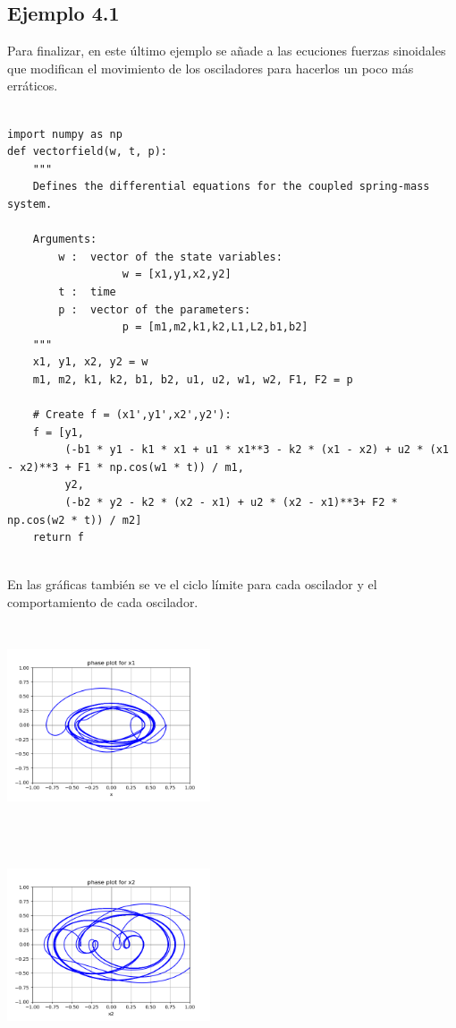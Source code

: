 \documentclass{article}
\begin{document}
\subsection{Ejemplo 4.1}

Para finalizar, en este último ejemplo se añade a las ecuciones fuerzas sinoidales que modifican el movimiento de los osciladores para hacerlos un poco más erráticos.

\begin{verbatim}

import numpy as np
def vectorfield(w, t, p):
    """
    Defines the differential equations for the coupled spring-mass system.

    Arguments:
        w :  vector of the state variables:
                  w = [x1,y1,x2,y2]
        t :  time
        p :  vector of the parameters:
                  p = [m1,m2,k1,k2,L1,L2,b1,b2]
    """
    x1, y1, x2, y2 = w
    m1, m2, k1, k2, b1, b2, u1, u2, w1, w2, F1, F2 = p

    # Create f = (x1',y1',x2',y2'):
    f = [y1,
         (-b1 * y1 - k1 * x1 + u1 * x1**3 - k2 * (x1 - x2) + u2 * (x1 - x2)**3 + F1 * np.cos(w1 * t)) / m1,
         y2,
         (-b2 * y2 - k2 * (x2 - x1) + u2 * (x2 - x1)**3+ F2 * np.cos(w2 * t)) / m2]
    return f
    
\end{verbatim}


En las gráficas también se ve el ciclo límite para cada oscilador y el comportamiento de cada oscilador.
\begin{center}
  \includegraphics[width=6cm, height=6cm]{ej4_11.png}
\end{center}


\begin{center}
  \includegraphics[width=6cm, height=6cm]{ej4_12.png}
\end{center}
\end{document}

